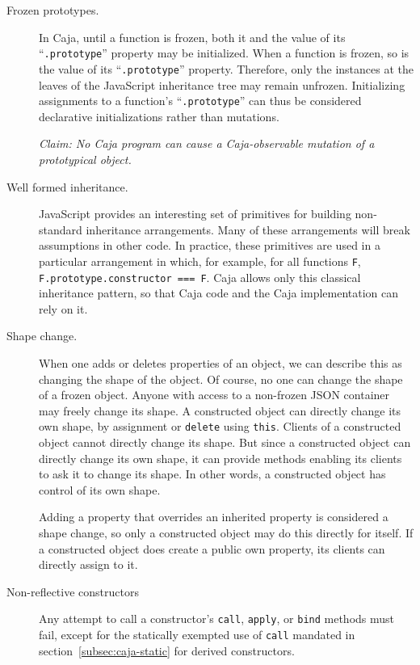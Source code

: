 \documentclass[letterpaper,twocolumn,10pt]{article}
\newcommand{\code}[1]{{\tt {#1}}}              %
\begin{document}
\begin{description}

  \item[Frozen prototypes.] In Caja, until a function is frozen, both it and 
  the value of its ``\code{.prototype}'' property may be initialized. When a 
  function is frozen, so is the value of its ``\code{.prototype}'' property. 
  Therefore, only the instances at the leaves of the JavaScript inheritance 
  tree may remain unfrozen. Initializing 
  assignments to a function's ``\code{.prototype}'' can thus be considered declarative initializations rather than 
  mutations.
  
  \emph{Claim: No Caja program can cause a Caja-observable mutation of a 
  prototypical object.}
  
   \item[Well formed inheritance.] JavaScript provides an interesting set of 
   primitives for building non-standard inheritance arrangements. Many of 
   these arrangements will break assumptions in other code. In practice, 
   these primitives are used in a particular arrangement in which, for 
   example, for all functions \code{F}, \code{F.prototype.constructor === F}. 
   Caja allows only this classical inheritance pattern, so that Caja code and 
   the Caja implementation can rely on it.
   
   \item[Shape change.] When one adds or deletes properties of an object, we 
   can describe this as changing the shape of the object. Of course, no one 
   can change the shape of a frozen object. Anyone with access to a 
   non-frozen JSON container may freely change its shape. A constructed 
   object can directly change its own shape, by assignment or \code{delete} 
   using \code{this}. Clients of a constructed object cannot directly change 
   its shape. But since a constructed object can directly change its own 
   shape, it can provide methods enabling its clients to ask it to change its 
   shape. In other words, a constructed object has control of its own shape.
   
   Adding a property that overrides an inherited property is considered a 
   shape change, so only a constructed object may do this directly for 
   itself. If a constructed object does create a public own property, its 
   clients can directly assign to it.
   
   \item[Non-reflective constructors] Any attempt to call a constructor's 
   \code{call}, \code{apply}, or \code{bind} methods must fail, except for 
   the statically exempted use of \code{call} mandated in section~\ref{subsec:caja-static} for derived 
   constructors.
   

\end{description}
\end{document}
